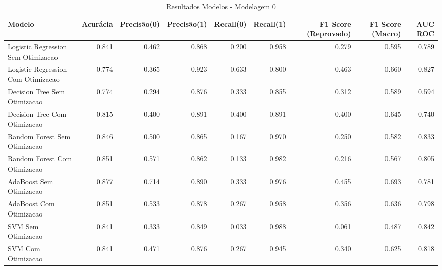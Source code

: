\begin{table}[H] %
    \centering
    \caption{Resultados Modelos - Modelagem 0}
    \label{tab:resultados_modelagem_0}
    \renewcommand{\arraystretch}{1.25} %
    \begin{adjustwidth}{ -1in }{ -1in } %
    \centering %
    \small %
    \begin{tabular}{lrrrrrrrr}
\toprule
                            Modelo &  Acurácia &  Precisão(0) &  Precisão(1) &  Recall(0) &  Recall(1) &  F1 Score (Reprovado) &  F1 Score (Macro) &  AUC ROC \\
\midrule
Logistic Regression Sem Otimizacao &     0.841 &        0.462 &        0.868 &      0.200 &      0.958 &                 0.279 &             0.595 &    0.789 \\
Logistic Regression Com Otimizacao &     0.774 &        0.365 &        0.923 &      0.633 &      0.800 &                 0.463 &             0.660 &    0.827 \\
      Decision Tree Sem Otimizacao &     0.774 &        0.294 &        0.876 &      0.333 &      0.855 &                 0.312 &             0.589 &    0.594 \\
      Decision Tree Com Otimizacao &     0.815 &        0.400 &        0.891 &      0.400 &      0.891 &                 0.400 &             0.645 &    0.740 \\
      Random Forest Sem Otimizacao &     0.846 &        0.500 &        0.865 &      0.167 &      0.970 &                 0.250 &             0.582 &    0.833 \\
      Random Forest Com Otimizacao &     0.851 &        0.571 &        0.862 &      0.133 &      0.982 &                 0.216 &             0.567 &    0.805 \\
           AdaBoost Sem Otimizacao &     0.877 &        0.714 &        0.890 &      0.333 &      0.976 &                 0.455 &             0.693 &    0.781 \\
           AdaBoost Com Otimizacao &     0.851 &        0.533 &        0.878 &      0.267 &      0.958 &                 0.356 &             0.636 &    0.798 \\
                SVM Sem Otimizacao &     0.841 &        0.333 &        0.849 &      0.033 &      0.988 &                 0.061 &             0.487 &    0.842 \\
                SVM Com Otimizacao &     0.841 &        0.471 &        0.876 &      0.267 &      0.945 &                 0.340 &             0.625 &    0.818 \\
\bottomrule
\end{tabular}
    \end{adjustwidth}
    \renewcommand{\arraystretch}{1.0} %
\end{table}
